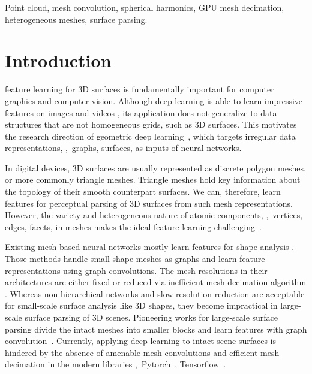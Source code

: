 \begin{IEEEkeywords}
\color{black}Point cloud, mesh convolution, spherical harmonics, GPU mesh decimation, heterogeneous meshes, surface parsing.
\end{IEEEkeywords}

\section{Introduction}\label{sec:intro}

 feature learning for 3D surfaces is fundamentally important for computer graphics and computer vision. 
Although deep learning is able to learn impressive features on images and videos \cite{krizhevsky2017imagenet,he2016deep,liu2016ssd}, {\color{black}its application does not generalize to 
data structures that are not homogeneous grids, such as 3D surfaces. This motivates the research direction of geometric deep learning~\cite{bronstein2017geometric}, which targets irregular data representations, \ie,~graphs, surfaces,  as inputs of neural networks.}

{\color{black}
In digital devices, 3D surfaces are usually represented as discrete polygon meshes, or more commonly triangle meshes. Triangle meshes hold key information about the topology of their smooth counterpart surfaces. We can, therefore, learn features for perceptual parsing of 3D surfaces from such mesh representations. 
However, the variety and heterogeneous nature of atomic components, \ie,~vertices, edges, facets, in meshes makes the ideal feature learning  challenging~\cite{hanocka2019meshcnn,schult2020dualconvmesh,lei2021picasso}.}

{\color{black}
Existing mesh-based 
neural networks mostly learn features for shape analysis \cite{boscaini2016learning,hanocka2019meshcnn,monti2017geometric,ranjan2018generating}. 
Those methods handle small shape meshes as graphs and learn feature representations using graph convolutions. The mesh resolutions in their architectures are either fixed or reduced via inefficient mesh decimation algorithm \cite{garland1999quadric,garland1997surface,rossignac1993multi,zhou2018open3d}.
Whereas non-hierarchical networks and slow resolution reduction are acceptable for small-scale surface analysis like 3D shapes, they become impractical in large-scale surface parsing of 3D scenes. Pioneering works for large-scale surface parsing divide the intact meshes into smaller blocks and learn features with graph convolution~\cite{schult2020dualconvmesh}. 
Currently, applying deep learning to intact scene surfaces is hindered by the absence of amenable mesh convolutions and efficient mesh decimation in the modern libraries \eg,~Pytorch~\cite{paszke2019pytorch}, Tensorflow~\cite{abadi2016tensorflow}.}  

